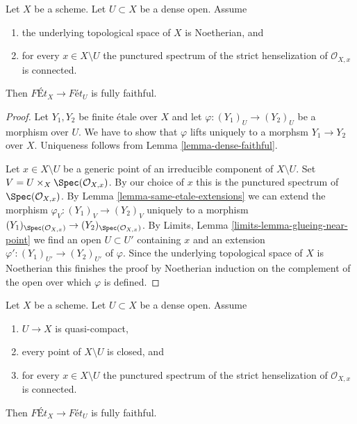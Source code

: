 \begin{lemma}
\label{lemma-quasi-compact-dense-open-connected-at-infinity-Noetherian}
Let $X$ be a scheme. Let $U \subset X$ be a dense open. Assume
\begin{enumerate}
\item the underlying topological space of $X$ is Noetherian, and
\item for every $x \in X \setminus U$ the punctured spectrum of the
strict henselization of $\mathcal{O}_{X, x}$ is connected.
\end{enumerate}
Then $\textit{F\'Et}_X \to \textit{F\'et}_U$ is fully faithful.
\end{lemma}

\begin{proof}
Let $Y_1, Y_2$ be finite \'etale over $X$ and let
$\varphi : (Y_1)_U \to (Y_2)_U$ be a morphism over $U$. We have to show that
$\varphi$ lifts uniquely to a morphsm $Y_1 \to Y_2$ over $X$.
Uniqueness follows from Lemma \ref{lemma-dense-faithful}.

\medskip\noindent
Let $x \in X \setminus U$ be a generic point of an irreducible component
of $X \setminus U$. Set $V = U \times_X \Spec(\mathcal{O}_{X, x})$.
By our choice of $x$ this is the punctured spectrum of
$\Spec(\mathcal{O}_{X, x})$. By
Lemma \ref{lemma-same-etale-extensions}
we can extend the morphism $\varphi_V : (Y_1)_V \to (Y_2)_V$
uniquely to a morphism
$(Y_1)_{\Spec(\mathcal{O}_{X, x})} \to (Y_2)_{\Spec(\mathcal{O}_{X, x})}$.
By Limits, Lemma \ref{limits-lemma-glueing-near-point}
we find an open $U \subset U'$ containing $x$ and an extension
$\varphi' : (Y_1)_{U'} \to (Y_2)_{U'}$ of $\varphi$.
Since the underlying topological space of $X$ is Noetherian
this finishes the proof by Noetherian induction on the complement
of the open over which $\varphi$ is defined.
\end{proof}

\begin{lemma}
\label{lemma-retrocompact-dense-open-connected-at-infinity-closed}
Let $X$ be a scheme. Let $U \subset X$ be a dense open. Assume
\begin{enumerate}
\item $U \to X$ is quasi-compact,
\item every point of $X \setminus U$ is closed, and
\item for every $x \in X \setminus U$ the punctured spectrum of the
strict henselization of $\mathcal{O}_{X, x}$ is connected.
\end{enumerate}
Then $\textit{F\'Et}_X \to \textit{F\'et}_U$ is fully faithful.
\end{lemma}

